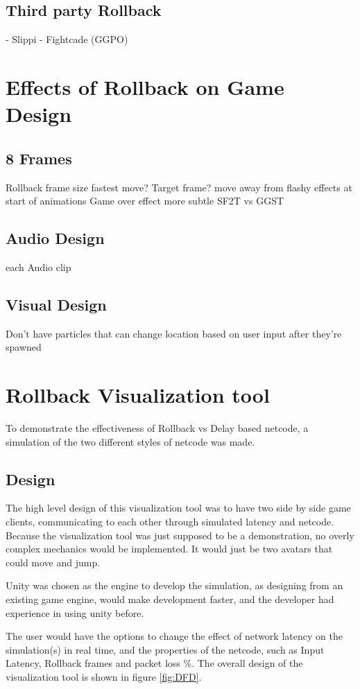 \documentclass{entcs}
\begin{document}
\subsection{Third party Rollback}
- Slippi
- Fightcade (GGPO)

\section{Effects of Rollback on Game Design}
\subsection{8 Frames}
Rollback frame size fastest move? Target frame?
move away from flashy effects at start of animations
Game over effect more subtle SF2T vs GGST 
\subsection{Audio Design}
each Audio clip 
\subsection{Visual Design}
Don't have particles that can change location based on user input after they're spawned

\section{Rollback Visualization tool}
To demonstrate the effectiveness of Rollback vs Delay based netcode, a simulation of the two different styles of netcode was made.
\subsection{Design}
The high level design of this visualization tool was to have two side by side game clients, communicating to each other through simulated latency and netcode. Because the visualization tool was just supposed to be a demonstration, no overly complex mechanics would be implemented. It would just be two avatars that could move and jump.

Unity was chosen as the engine to develop the simulation, as designing from an existing game engine, would make development faster, and the developer had experience in using unity before.

The user would have the options to change the effect of network latency on the simulation(s) in real time, and the properties of the netcode, such as Input Latency, Rollback frames and packet loss \%. 
The overall design of the visualization tool is shown in figure \ref{fig:DFD}.
\end{document}
